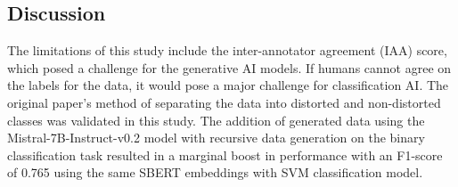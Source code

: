\documentclass[a0,landscape]{a0poster}
\begin{document}
\begin{multicols}{4}
\color{Teal}
\section*{Discussion}
\color{Black}

The limitations of this study include the inter-annotator agreement (IAA) score, which posed a challenge for the generative AI models. If humans cannot agree on the labels for the data, it would pose a major challenge for classification AI. The original paper's method of separating the data into distorted and non-distorted classes was validated in this study. The addition of generated data using the Mistral-7B-Instruct-v0.2 model with recursive data generation on the binary classification task resulted in a marginal boost in performance with an F1-score of 0.765 using the same SBERT embeddings with SVM classification model.


\end{multicols}
\end{document}
